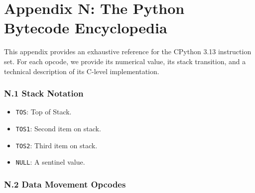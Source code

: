 \hypertarget{appendix-n-the-python-bytecode-encyclopedia}{%
\chapter{Appendix N: The Python Bytecode
Encyclopedia}\label{appendix-n-the-python-bytecode-encyclopedia}}

This appendix provides an exhaustive reference for the CPython 3.13
instruction set. For each opcode, we provide its numerical value, its
stack transition, and a technical description of its C-level
implementation.

\hypertarget{n.1-stack-notation}{%
\subsection{N.1 Stack Notation}\label{n.1-stack-notation}}

\begin{itemize}
\tightlist
\item
  \passthrough{\lstinline!TOS!}: Top of Stack.
\item
  \passthrough{\lstinline!TOS1!}: Second item on stack.
\item
  \passthrough{\lstinline!TOS2!}: Third item on stack.
\item
  \passthrough{\lstinline!NULL!}: A sentinel value.
\end{itemize}

\hypertarget{n.2-data-movement-opcodes}{%
\subsection{N.2 Data Movement Opcodes}\label{n.2-data-movement-opcodes}}

